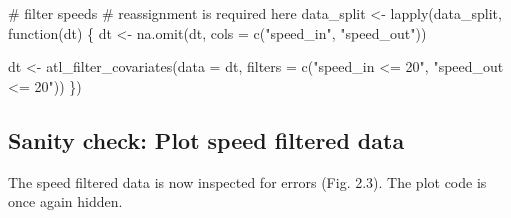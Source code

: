 \documentclass[]{scrreprt}
\newenvironment{Shaded}{}{}
\newcommand{\CommentTok}[1]{\textcolor[rgb]{0.00,0.50,0.00}{#1}}
\newcommand{\ControlFlowTok}[1]{\textcolor[rgb]{0.00,0.00,1.00}{#1}}
\newcommand{\DataTypeTok}[1]{#1}
\newcommand{\KeywordTok}[1]{\textcolor[rgb]{0.00,0.00,1.00}{#1}}
\newcommand{\NormalTok}[1]{#1}
\newcommand{\StringTok}[1]{\textcolor[rgb]{0.00,0.50,0.50}{#1}}
\begin{document}
\begin{Shaded}
\begin{Highlighting}[]
\CommentTok{# filter speeds}
\CommentTok{# reassignment is required here}
\NormalTok{data_split <-}\StringTok{ }\KeywordTok{lapply}\NormalTok{(data_split, }\ControlFlowTok{function}\NormalTok{(dt) \{}
\NormalTok{  dt <-}\StringTok{ }\KeywordTok{na.omit}\NormalTok{(dt, }\DataTypeTok{cols =} \KeywordTok{c}\NormalTok{(}\StringTok{"speed_in"}\NormalTok{, }\StringTok{"speed_out"}\NormalTok{))}
  
\NormalTok{  dt <-}\StringTok{ }\KeywordTok{atl_filter_covariates}\NormalTok{(}\DataTypeTok{data =}\NormalTok{ dt,}
                              \DataTypeTok{filters =} \KeywordTok{c}\NormalTok{(}\StringTok{"speed_in <= 20"}\NormalTok{,}
                                          \StringTok{"speed_out <= 20"}\NormalTok{))}
\NormalTok{\})}
\end{Highlighting}
\end{Shaded}

\hypertarget{sanity-check-plot-speed-filtered-data}{%
\subsection{Sanity check: Plot speed filtered data}\label{sanity-check-plot-speed-filtered-data}}

The speed filtered data is now inspected for errors (Fig. 2.3). The plot code is once again hidden.
\end{document}

